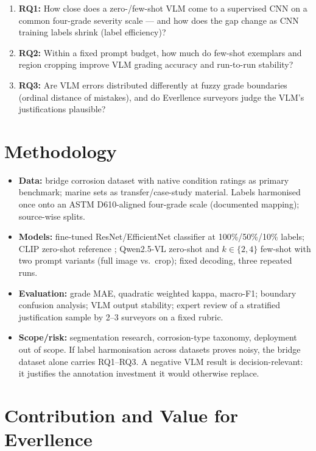\documentclass[10pt,a4paper]{article}
\begin{document}
\begin{enumerate}
    \item \textbf{RQ1:} How close does a zero-/few-shot VLM come to a supervised CNN on a common four-grade severity scale --- and how does the gap change as CNN training labels shrink (label efficiency)?
    \item \textbf{RQ2:} Within a fixed prompt budget, how much do few-shot exemplars and region cropping improve VLM grading accuracy and run-to-run stability?
    \item \textbf{RQ3:} Are VLM errors distributed differently at fuzzy grade boundaries (ordinal distance of mistakes), and do Everllence surveyors judge the VLM's justifications plausible?
\end{enumerate}

\section{Methodology}

\begin{itemize}
    \item \textbf{Data:} bridge corrosion dataset with native condition ratings \cite{ameli2023bridge} as primary benchmark; marine sets \cite{chliveros2021mavecodd} as transfer/case-study material. Labels harmonised once onto an ASTM D610-aligned four-grade scale (documented mapping); source-wise splits.
    \item \textbf{Models:} fine-tuned ResNet/EfficientNet classifier at 100\%/50\%/10\% labels; CLIP zero-shot reference \cite{radford2021clip}; Qwen2.5-VL zero-shot and $k\in\{2,4\}$ few-shot with two prompt variants (full image vs.\ crop); fixed decoding, three repeated runs.
    \item \textbf{Evaluation:} grade MAE, quadratic weighted kappa, macro-F1; boundary confusion analysis; VLM output stability; expert review of a stratified justification sample by 2--3 surveyors on a fixed rubric.
    \item \textbf{Scope/risk:} segmentation research, corrosion-type taxonomy, deployment out of scope. If label harmonisation across datasets proves noisy, the bridge dataset alone carries RQ1--RQ3. A negative VLM result is decision-relevant: it justifies the annotation investment it would otherwise replace.
\end{itemize}

\section{Contribution and Value for Everllence}
\end{document}
